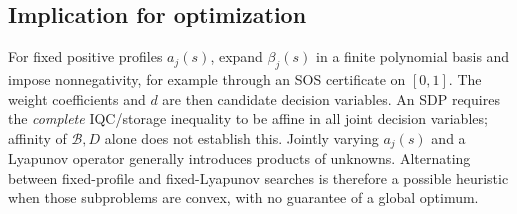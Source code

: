 ﻿\documentclass[11pt,a4paper]{article}
\begin{document}
\subsection*{Implication for optimization}
For fixed positive profiles $a_j(s)$, expand $\beta_j(s)$ in a finite
polynomial basis and impose nonnegativity, for example through an
SOS certificate on $[0,1]$. The weight coefficients and $d$ are then
candidate decision variables. An SDP requires the \emph{complete}
IQC/storage inequality to be affine in all joint decision variables;
affinity of $\mathcal B,D$ alone does not establish this. Jointly varying
$a_j(s)$ and a Lyapunov operator generally introduces products of
unknowns. Alternating between fixed-profile and fixed-Lyapunov searches
is therefore a possible heuristic when those subproblems are convex,
with no guarantee of a global optimum.
\endgroup


\end{document}
